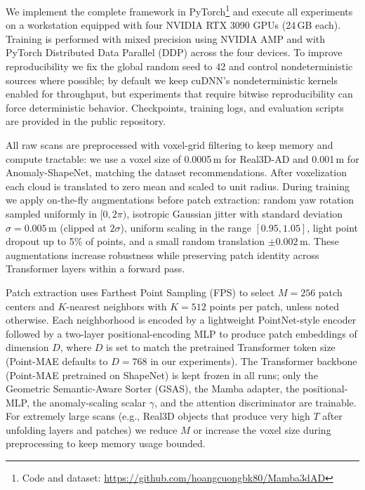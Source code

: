 We implement the complete framework in PyTorch\footnote{Code and dataset: \url{https://github.com/hoangcuongbk80/Mamba3dAD}} and execute all experiments on a workstation equipped with four NVIDIA RTX 3090 GPUs (24\,GB each). Training is performed with mixed precision using NVIDIA AMP and with PyTorch Distributed Data Parallel (DDP) across the four devices. To improve reproducibility we fix the global random seed to 42 and control nondeterministic sources where possible; by default we keep cuDNN’s nondeterministic kernels enabled for throughput, but experiments that require bitwise reproducibility can force deterministic behavior. Checkpoints, training logs, and evaluation scripts are provided in the public repository.

All raw scans are preprocessed with voxel-grid filtering to keep memory and compute tractable: we use a voxel size of 0.0005\,m for Real3D-AD and 0.001\,m for Anomaly-ShapeNet, matching the dataset recommendations. After voxelization each cloud is translated to zero mean and scaled to unit radius. During training we apply on-the-fly augmentations before patch extraction: random yaw rotation sampled uniformly in $[0,2\pi)$, isotropic Gaussian jitter with standard deviation $\sigma=0.005$\,m (clipped at $2\sigma$), uniform scaling in the range $[0.95,1.05]$, light point dropout up to 5\% of points, and a small random translation $\pm 0.002$\,m. These augmentations increase robustness while preserving patch identity across Transformer layers within a forward pass.

Patch extraction uses Farthest Point Sampling (FPS) to select $M=256$ patch centers and $K$-nearest neighbors with $K=512$ points per patch, unless noted otherwise. Each neighborhood is encoded by a lightweight PointNet-style encoder followed by a two-layer positional-encoding MLP to produce patch embeddings of dimension $D$, where $D$ is set to match the pretrained Transformer token size (Point-MAE defaults to $D=768$ in our experiments). The Transformer backbone (Point-MAE pretrained on ShapeNet) is kept frozen in all runs; only the Geometric Semantic-Aware Sorter (GSAS), the Mamba adapter, the positional-MLP, the anomaly-scaling scalar $\gamma$, and the attention discriminator are trainable. For extremely large scans (e.g., Real3D objects that produce very high $T$ after unfolding layers and patches) we reduce $M$ or increase the voxel size during preprocessing to keep memory usage bounded.

